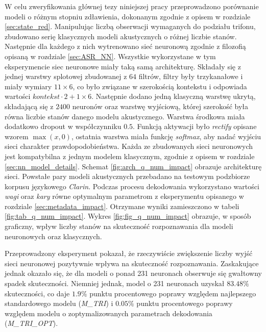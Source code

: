 \documentclass[shortabstract, mgr]{iithesis}
\begin{document}
		W celu zweryfikowania głównej tezy niniejszej pracy przeprowadzono porównanie modeli o różnym stopniu zdławienia, dokonanym zgodnie z opisem w rozdziale \ref{sec:state_red}. Manipulując liczbą obserwacji wymaganych do podziału trifonu, zbudowano serię klasycznych modeli akustycznych o różnej liczbie stanów. Następnie dla każdego z nich wytrenowano sieć neuronową zgodnie z filozofią opisaną w rozdziale \ref{sec:ASR_NN}. Wszystkie wykorzystane w tym eksperymencie siec neuronowe miały taką samą architekturę. Składały się z jednej warstwy splotowej zbudowanej z $64$ filtrów, filtry były trzykanałowe i miały wymiary $11\times6$, co było związane w szerokością kontekstu i odpowiada wartości $kontekst \cdot 2 + 1\times6$. Następnie dodano jedną klasyczną warstwę ukrytą, składającą się z $2400$ neuronów oraz warstwę wyjściową, której szerokość była równa liczbie stanów danego modelu akustycznego. Warstwa środkowa miała dodatkowo dropout w współczynniku $0.5$. Funkcją aktywacji było \textit{rectify} opisane wzorem $\max(x,0)$, ostatnia warstwa miała funkcję \textit{softmax}, aby nadać wyjściu sieci charakter prawdopodobieństwa. Każda ze zbudowanych sieci neuronowych jest kompatybilna z jednym modelem klasycznym, zgodnie z opisem w rozdziale \ref{sec:nn_model_details}. Schemat \ref{fig:arch_q_num_impact} obrazuje architekturę sieci. Powstałe pary modeli akustycznych przebadano na testowym podzbiorze korpusu językowego \textit{Clarin}. Podczas procesu dekodowania wykorzystano wartości \textit{wagi} oraz \textit{kary} równe optymalnym parametrom z eksperymentu opisanego w rozdziale \ref{sec:metadata_impact}. Otrzymane wyniki zamieszczono w tabeli \ref{fig:tab_q_num_impact}. Wykres \ref{fig:fig_q_num_impact} obrazuje, w sposób graficzny, wpływ liczby stanów na skuteczność rozpoznawania dla modeli neuronowych oraz klasycznych.
		
		Przeprowadzony eksperyment pokazał, że rzeczywiście zwiększenie liczby wyjść sieci neuronowej pozytywnie wpływa na skuteczność rozpoznawania. Zaskakujące jednak okazało się, że dla modeli o ponad 231 neuronach obserwuje się gwałtowny spadek skuteczności. Niemniej jednak, model o 231 neuronach uzyskał  $83.48\%$ skuteczności, co daje $1.9\%$ punktu procentowego poprawy względem najlepszego standardowego modelu (\textit{M\_TRI}) i $0.05\%$ punktu procentowego poprawy względem modelu o zoptymalizowanych parametrach dekodowania (\textit{M\_TRI\_OPT}). 
		
\end{document}
